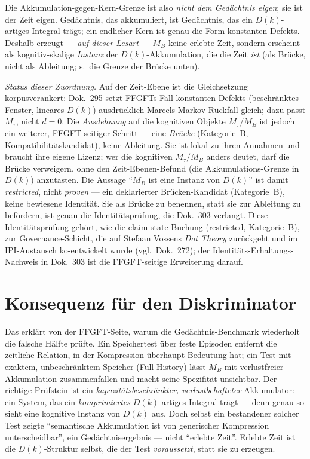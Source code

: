 Die Akkumulation-gegen-Kern-Grenze ist also \emph{nicht dem Gedächtnis eigen}; sie ist der
Zeit eigen. Gedächtnis, das akkumuliert, ist Gedächtnis, das ein $D(k)$-artiges Integral
trägt; ein endlicher Kern ist genau die Form konstanten Defekts. Deshalb erzeugt --- \emph{auf dieser Lesart} --- $M_B$ keine
erlebte Zeit, sondern erscheint als kognitiv-skalige \emph{Instanz} der $D(k)$-Akkumulation,
die die Zeit \emph{ist} (als Brücke, nicht als Ableitung; s.\ die Grenze der Brücke unten).

\emph{Status dieser Zuordnung.} Auf der Zeit-Ebene ist die Gleichsetzung korpusverankert:
Dok.~295 setzt FFGFTs Fall konstanten Defekts (beschränktes Fenster, lineares $D(k)$)
ausdrücklich Marcels Markov-Rückfall gleich; dazu passt $M_\tau$, nicht $d = 0$. Die
\emph{Ausdehnung} auf die kognitiven Objekte $M_\tau/M_B$ ist jedoch ein weiterer,
FFGFT-seitiger Schritt --- eine \emph{Brücke} (Kategorie~B, Kompatibilitätskandidat), keine
Ableitung. Sie ist lokal zu ihren Annahmen und braucht ihre eigene Lizenz; wer die
kognitiven $M_\tau/M_B$ anders deutet, darf die Brücke verweigern, ohne den
Zeit-Ebenen-Befund (die Akkumulations-Grenze in $D(k)$) anzutasten. Die Aussage
\enquote{$M_B$ ist eine Instanz von $D(k)$} ist damit \emph{restricted}, nicht
\emph{proven} --- ein deklarierter Brücken-Kandidat (Kategorie~B), keine bewiesene
Identität. Sie als Brücke zu
benennen, statt sie zur Ableitung zu befördern, ist genau die Identitätsprüfung, die
Dok.~303 verlangt. Diese Identitätsprüfung gehört, wie die claim-state-Buchung (restricted,
Kategorie~B), zur Governance-Schicht, die auf Stefaan Vossens \emph{Dot Theory} zurückgeht und
im IPI-Austausch ko-entwickelt wurde (vgl.\ Dok.~272); der Identitäts-Erhaltungs-Nachweis in
Dok.~303 ist die FFGFT-seitige Erweiterung darauf.

\section{Konsequenz für den Diskriminator}

Das erklärt von der FFGFT-Seite, warum die Gedächtnis-Benchmark wiederholt die falsche
Hälfte prüfte. Ein Speichertest über feste Episoden entfernt die zeitliche Relation, in der
Kompression überhaupt Bedeutung hat; ein Test mit exaktem, unbeschränktem Speicher
(Full-History) lässt $M_B$ mit verlustfreier Akkumulation zusammenfallen und macht seine
Spezifität unsichtbar. Der richtige Prüfstein ist ein \emph{kapazitätsbeschränkter,
verlustbehafteter} Akkumulator: ein System, das ein \emph{komprimiertes}
$D(k)$-artiges Integral trägt --- denn genau so sieht eine kognitive Instanz von $D(k)$ aus.
Doch selbst ein bestandener solcher Test zeigte \enquote{semantische Akkumulation ist von
generischer Kompression unterscheidbar}, ein Gedächtnisergebnis --- nicht \enquote{erlebte
Zeit}. Erlebte Zeit ist die $D(k)$-Struktur selbst, die der Test \emph{voraussetzt}, statt
sie zu erzeugen.


